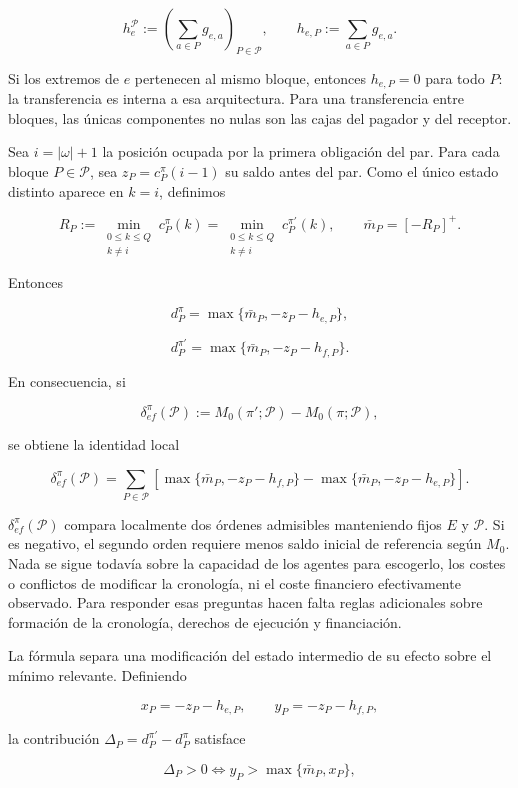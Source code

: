 \documentclass[10pt,a5paper,twoside]{article}
\begin{document}
\[
h_e^{\mathcal P}
:=
\left(\sum_{a\in P}g_{e,a}\right)_{P\in\mathcal P},
\qquad
h_{e,P}:=\sum_{a\in P}g_{e,a}.
\]

Si los extremos de \(e\) pertenecen al mismo bloque, entonces
\(h_{e,P}=0\) para todo \(P\): la transferencia es interna a esa
arquitectura. Para una transferencia entre bloques, las únicas componentes
no nulas son las cajas del pagador y del receptor.

Sea \(i=|\omega|+1\) la posición ocupada por la primera obligación del par.
Para cada bloque \(P\in\mathcal P\), sea \(z_P=c_P^\pi(i-1)\) su saldo
antes del par. Como el único estado distinto aparece en \(k=i\), definimos

\[
R_P
:=
\min_{\substack{0\le k\le Q\\ k\ne i}}c_P^\pi(k)
=
\min_{\substack{0\le k\le Q\\ k\ne i}}c_P^{\pi'}(k),
\qquad
\bar m_P=[-R_P]^+.
\]

Entonces

\[
d_P^\pi
=
\max\{\bar m_P,-z_P-h_{e,P}\},
\]

\[
d_P^{\pi'}
=
\max\{\bar m_P,-z_P-h_{f,P}\}.
\]

En consecuencia, si

\[
\delta_{ef}^{\pi}(\mathcal P)
:=
M_0(\pi';\mathcal P)-M_0(\pi;\mathcal P),
\]

se obtiene la identidad local

\[
\boxed{
\delta_{ef}^{\pi}(\mathcal P)
=
\sum_{P\in\mathcal P}
\left[
\max\{\bar m_P,-z_P-h_{f,P}\}
-
\max\{\bar m_P,-z_P-h_{e,P}\}
\right].
}
\]

\(\delta_{ef}^{\pi}(\mathcal P)\) compara localmente dos órdenes admisibles
manteniendo fijos \(E\) y \(\mathcal P\). Si es negativo, el segundo orden
requiere menos saldo inicial de referencia según \(M_0\). Nada se sigue todavía
sobre la capacidad de los agentes para escogerlo, los costes o conflictos de
modificar la cronología, ni el coste financiero efectivamente observado. Para
responder esas preguntas hacen falta reglas adicionales sobre formación de la
cronología, derechos de ejecución y financiación.

La fórmula separa una modificación del estado intermedio de su efecto
sobre el mínimo relevante. Definiendo

\[
x_P=-z_P-h_{e,P},
\qquad
y_P=-z_P-h_{f,P},
\]

la contribución \(\Delta_P=d_P^{\pi'}-d_P^\pi\) satisface

\[
\Delta_P>0
\iff
y_P>\max\{\bar m_P,x_P\},
\]
\end{document}
